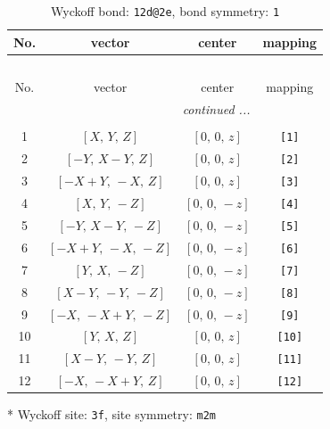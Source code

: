 \documentclass[fleqn,8pt]{jsarticle}
\begin{document}
\begin{longtable}{cccc}
\caption{Wyckoff bond: {\tt 12d@2e}, bond symmetry: {\tt 1}}
 \\
 \hline \hline
No. & vector & center & mapping \\ \hline \endfirsthead

\multicolumn{3}{l}{\tablename\ \thetable{}} \\
 \hline \hline
No. & vector & center & mapping \\ \hline \endhead

 \hline \hline
\multicolumn{3}{r}{\footnotesize\it continued ...} \\ \endfoot

 \hline \hline
\multicolumn{3}{r}{} \\ \endlastfoot

1 & $\left[ X,\, Y,\, Z \right]$ & $\left[ 0,\, 0,\, z \right]$ & {\tt [1]} \\ \hline
2 & $\left[ - Y,\, X - Y,\, Z \right]$ & $\left[ 0,\, 0,\, z \right]$ & {\tt [2]} \\ \hline
3 & $\left[ - X + Y,\, - X,\, Z \right]$ & $\left[ 0,\, 0,\, z \right]$ & {\tt [3]} \\ \hline
4 & $\left[ X,\, Y,\, - Z \right]$ & $\left[ 0,\, 0,\, - z \right]$ & {\tt [4]} \\ \hline
5 & $\left[ - Y,\, X - Y,\, - Z \right]$ & $\left[ 0,\, 0,\, - z \right]$ & {\tt [5]} \\ \hline
6 & $\left[ - X + Y,\, - X,\, - Z \right]$ & $\left[ 0,\, 0,\, - z \right]$ & {\tt [6]} \\ \hline
7 & $\left[ Y,\, X,\, - Z \right]$ & $\left[ 0,\, 0,\, - z \right]$ & {\tt [7]} \\ \hline
8 & $\left[ X - Y,\, - Y,\, - Z \right]$ & $\left[ 0,\, 0,\, - z \right]$ & {\tt [8]} \\ \hline
9 & $\left[ - X,\, - X + Y,\, - Z \right]$ & $\left[ 0,\, 0,\, - z \right]$ & {\tt [9]} \\ \hline
10 & $\left[ Y,\, X,\, Z \right]$ & $\left[ 0,\, 0,\, z \right]$ & {\tt [10]} \\ \hline
11 & $\left[ X - Y,\, - Y,\, Z \right]$ & $\left[ 0,\, 0,\, z \right]$ & {\tt [11]} \\ \hline
12 & $\left[ - X,\, - X + Y,\, Z \right]$ & $\left[ 0,\, 0,\, z \right]$ & {\tt [12]} \\
\end{longtable}
* Wyckoff site: {\tt 3f}, site symmetry: {\tt m2m}
\renewcommand{\arraystretch}{1.2}
\end{document}

